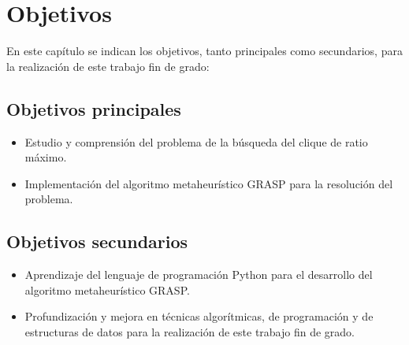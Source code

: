 
\chapter{Objetivos} %

\label{Chapter2}


En este capítulo se indican los objetivos, tanto principales como secundarios, para la realización de este trabajo fin de grado:

\section{Objetivos principales}
\begin{itemize}
	\item Estudio y comprensión del problema de la búsqueda del clique de ratio máximo.
	\item Implementación del algoritmo metaheurístico GRASP para la resolución del problema.
\end{itemize}

\section{Objetivos secundarios}
\begin{itemize}
	\item Aprendizaje del lenguaje de programación Python para el desarrollo del algoritmo metaheurístico GRASP.
	\item Profundización y mejora en técnicas algorítmicas, de programación y de estructuras de datos para la realización de este trabajo fin de grado.
\end{itemize}

